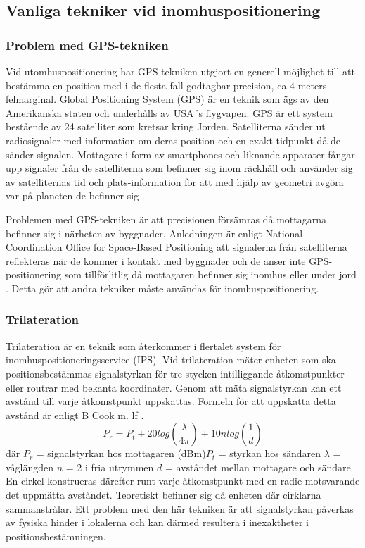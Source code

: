 \documentclass[swedish, a4paper,12pt]{article}
\begin{document}
\subsection{Vanliga tekniker vid inomhuspositionering}

\subsubsection{Problem med GPS-tekniken}
Vid utomhuspositionering har GPS-tekniken utgjort en generell möjlighet till att bestämma en position med i de flesta fall godtagbar precision, ca 4 meters felmarginal\cite{GPS_US_ACCURACY}.
Global Positioning System (GPS) är en teknik som ägs av den Amerikanska staten och underhålls av USA´s flygvapen. GPS är ett system bestående av 24 satelliter som kretsar kring Jorden. Satelliterna sänder ut radiosignaler med information om deras position och en exakt tidpunkt då de sänder signalen. Mottagare i form av smartphones och liknande apparater fångar upp signaler från de satelliterna som befinner sig inom räckhåll och använder sig av satelliternas tid och plats-information för att med hjälp av geometri avgöra var på planeten de befinner sig \cite{GPS_US_HOW}.

Problemen med GPS-tekniken är att precisionen försämras då mottagarna befinner sig i närheten av byggnader. Anledningen är enligt National Coordination Office for Space-Based Positioning att signalerna från satelliterna reflekteras när de kommer i kontakt med byggnader och de anser inte GPS-positionering som tillförlitlig då mottagaren befinner sig inomhus eller under jord \cite{GPS_US_ACCURACY}. Detta gör att andra tekniker måste användas för inomhuspositionering.

\subsubsection{Trilateration}\label{triangulering}
Trilateration är en teknik som återkommer i flertalet system för inomhuspositioneringsservice (IPS). Vid trilateration mäter enheten som ska positionsbestämmas signalstyrkan för tre stycken intilliggande åtkomstpunkter eller routrar med bekanta koordinater. Genom att mäta signalstyrkan kan ett avstånd till varje åtkomstpunkt uppskattas. Formeln för att uppskatta detta avstånd är enligt B Cook m. lf \cite{cook2005indoor}.
\newline
$$ P_r = P_t + 20log(\frac{\lambda}{4\pi}) + 10nlog(\frac{1}{d})$$
där
$  P_r $ = signalstyrkan hos mottagaren (dBm)\newline $P_t$ = styrkan hos sändaren\newline
$\lambda$ = våglängden\newline
$ n $ = 2 i fria utrymmen\newline
$ d $ = avståndet mellan mottagare och sändare
\bigskip
\newline
En cirkel konstrueras därefter runt varje åtkomstpunkt med en radie motsvarande det uppmätta avståndet. %
Teoretiskt befinner sig då enheten där cirklarna sammanstrålar. Ett problem med den här tekniken är att signalstyrkan påverkas av fysiska hinder i lokalerna och kan därmed resultera i inexaktheter i positionsbestämningen.
\end{document}
